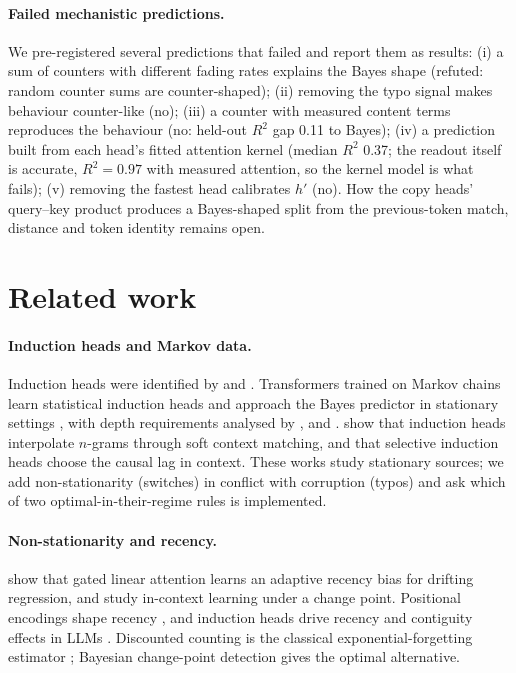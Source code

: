 \documentclass[11pt]{article}
\newcommand{\hp}{h'}
\begin{document}
\paragraph{Failed mechanistic predictions.} We pre-registered several predictions that failed and report them as results: (i) a sum of counters with different fading rates explains the Bayes shape (refuted: random counter sums are counter-shaped); (ii) removing the typo signal makes behaviour counter-like (no); (iii) a counter with measured content terms reproduces the behaviour (no: held-out $R^2$ gap 0.11 to Bayes); (iv) a prediction built from each head's fitted attention kernel (median $R^2$ 0.37; the readout itself is accurate, $R^2 = 0.97$ with measured attention, so the kernel model is what fails); (v) removing the fastest head calibrates $\hp$ (no). How the copy heads' query--key product produces a Bayes-shaped split from the previous-token match, distance and token identity remains open.

\section{Related work}

\paragraph{Induction heads and Markov data.} Induction heads were identified by \citet{elhage2021mathematical} and \citet{olsson2022context}. Transformers trained on Markov chains learn statistical induction heads and approach the Bayes predictor in stationary settings \citep{edelman2024evolution,nichani2024transformers,bietti2023birth,makkuva2025attention}, with depth requirements analysed by \citet{rajaraman2024transformers}, \citet{ekbote2025whatone} and \citet{zhou2026information}. \citet{dangelo2026induction} show that induction heads interpolate $n$-grams through soft context matching, and \citet{dangelo2025selective} that selective induction heads choose the causal lag in context. These works study stationary sources; we add non-stationarity (switches) in conflict with corruption (typos) and ask which of two optimal-in-their-regime rules is implemented.

\paragraph{Non-stationarity and recency.} \citet{qin2026learning} show that gated linear attention learns an adaptive recency bias for drifting regression, and \citet{dudley2026regime} study in-context learning under a change point. Positional encodings shape recency \citep{press2022alibi,kazemnejad2023impact,wu2025emergence,hegazy2026recency}, and induction heads drive recency and contiguity effects in LLMs \citep{mistry2025emergence,bajaj2025beyond,bajaj2026temporal}. Discounted counting is the classical exponential-forgetting estimator \citep{kulhavy1993general}; Bayesian change-point detection \citep{adams2007bayesian} gives the optimal alternative.
\end{document}
